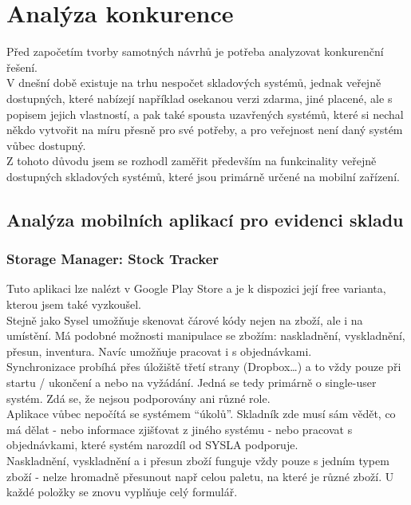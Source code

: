 
\section{Analýza konkurence}

Před započetím tvorby samotných návrhů je potřeba analyzovat konkurenční řešení.\\
V dnešní době existuje na trhu nespočet skladových systémů, jednak veřejně dostupných, které nabízejí například osekanou verzi zdarma, jiné placené, ale s popisem jejich vlastností, a pak také spousta uzavřených systémů, které si nechal někdo vytvořit na míru přesně pro své potřeby, a pro veřejnost není daný systém vůbec dostupný.\\
Z tohoto důvodu jsem se rozhodl zaměřit především na funkcinality veřejně dostupných skladových systémů, které jsou primárně určené na mobilní zařízení.\\

\subsection{Analýza mobilních aplikací pro evidenci skladu}

\subsubsection{Storage Manager: Stock Tracker}

Tuto aplikaci lze nalézt v Google Play Store a je k dispozici její free varianta, kterou jsem také vyzkoušel.\\
Stejně jako Sysel umožňuje skenovat čárové kódy nejen na zboží, ale i na umístění. Má podobné možnosti manipulace se zbožím: naskladnění, vyskladnění, přesun, inventura. Navíc umožňuje pracovat i s objednávkami.\\
Synchronizace probíhá přes úložiště třetí strany (Dropbox…) a to vždy pouze při startu / ukončení a nebo na vyžádání. Jedná se tedy primárně o single-user systém. Zdá se, že nejsou podporovány ani různé role.\\
Aplikace vůbec nepočítá se systémem “úkolů”. Skladník zde musí sám vědět, co má dělat - nebo informace zjišťovat z jiného systému - nebo pracovat s objednávkami, které systém narozdíl od SYSLA podporuje.\\
Naskladnění, vyskladnění a i přesun zboží funguje vždy pouze s jedním typem zboží - nelze hromadně přesunout např celou paletu, na které je různé zboží. U každé položky se znovu vyplňuje celý formulář.\\

